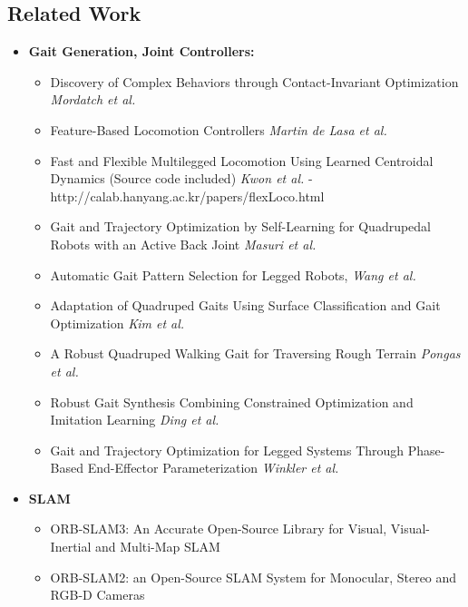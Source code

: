 \documentclass{article}
\theoremstyle{definition}
\theoremstyle{note}
\begin{document}
\subsection*{Related Work}
\begin{itemize}
\item \textbf{Gait Generation, Joint Controllers:}
    \begin{itemize}
    \item Discovery of Complex Behaviors through Contact-Invariant Optimization \textit{Mordatch et al.}
    \item Feature-Based Locomotion Controllers \textit{Martin de Lasa et al.}
    \item Fast and Flexible Multilegged Locomotion Using Learned Centroidal Dynamics (Source code included) \textit{Kwon et al.} - http://calab.hanyang.ac.kr/papers/flexLoco.html
    \item Gait and Trajectory Optimization by Self-Learning for Quadrupedal Robots with an Active Back Joint \textit{Masuri et al.}
    \item Automatic  Gait  Pattern  Selection for  Legged  Robots, \textit{Wang et al.}
    \item Adaptation  of  Quadruped  Gaits  Using  Surface Classification  and  Gait  Optimization \textit{Kim et al.}
    \item A Robust Quadruped Walking Gait for  Traversing Rough Terrain \textit{Pongas et al.}
    \item Robust  Gait  Synthesis  Combining  Constrained  Optimization  and Imitation Learning \textit{Ding et al.}
    \item Gait and Trajectory Optimization for Legged Systems Through Phase-Based End-Effector Parameterization \textit{Winkler et al.}
    \end{itemize}
\item \textbf{SLAM} 
    \begin{itemize}
        \item ORB-SLAM3: An Accurate Open-Source Library for Visual, Visual-Inertial and Multi-Map SLAM
        \item ORB-SLAM2: an Open-Source SLAM System for Monocular, Stereo and RGB-D Cameras
    \end{itemize}
\end{itemize}
\end{document}
